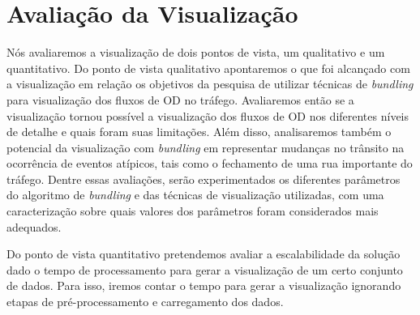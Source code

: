 \section{Avaliação da Visualização}
  Nós avaliaremos a visualização de dois pontos de vista, um qualitativo e um
quantitativo. Do ponto de vista qualitativo apontaremos o que foi alcançado com
a visualização em relação os objetivos da pesquisa de utilizar técnicas de \emph{bundling}
para visualização dos fluxos de OD no tráfego. Avaliaremos então se a visualização
tornou possível a visualização dos fluxos de OD nos diferentes níveis de
detalhe e quais foram suas limitações. Além disso, analisaremos também o potencial da
visualização com \emph{bundling} em representar mudanças no trânsito na
ocorrência de eventos atípicos, tais como o fechamento de uma rua importante do
tráfego. Dentre essas avaliações, serão experimentados os diferentes parâmetros
do algoritmo de \emph{bundling} e das técnicas de visualização utilizadas, com
uma caracterização sobre quais valores dos parâmetros foram considerados mais adequados.

  Do ponto de vista quantitativo pretendemos avaliar a escalabilidade da
solução dado o tempo de processamento para gerar a visualização de um certo
conjunto de dados. Para isso, iremos contar o tempo para gerar a visualização
ignorando etapas de pré-processamento e carregamento dos dados. 

